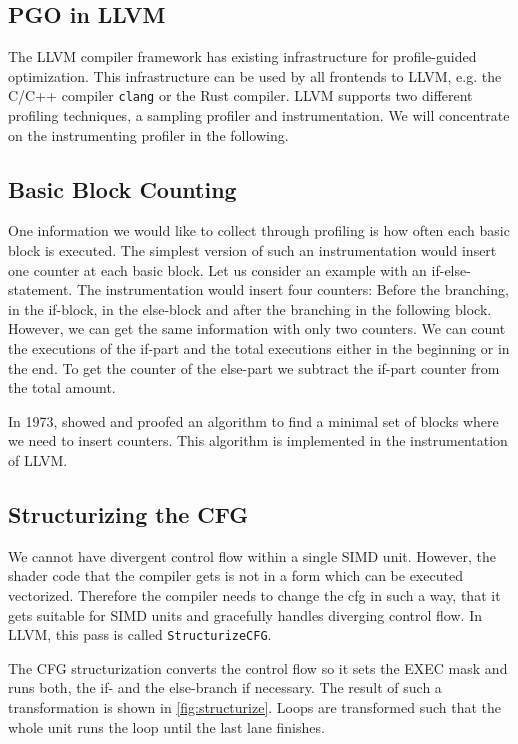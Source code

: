 \subsection{PGO in LLVM}
\label{sub:pgo-background}
The LLVM compiler framework has existing infrastructure for profile-guided optimization. This infrastructure can be used by all frontends to LLVM, e.g. the C/C++ compiler \texttt{clang} or the Rust compiler. LLVM supports two different profiling techniques, a sampling profiler and instrumentation. We will concentrate on the instrumenting profiler in the following.

\subsection{Basic Block Counting}
\label{sub:counter-instrumentation}
One information we would like to collect through profiling is how often each basic block is executed. The simplest version of such an instrumentation would insert one counter at each basic block.
Let us consider an example with an if-else-statement. The instrumentation would insert four counters: Before the branching, in the if-block, in the else-block and after the branching in the following block. However, we can get the same information with only two counters. We can count the executions of the if-part and the total executions either in the beginning or in the end. To get the counter of the else-part we subtract the if-part counter from the total amount.

In 1973, \citet{Knuth1973} showed and proofed an algorithm to find a minimal set of blocks where we need to insert counters. This algorithm is implemented in the instrumentation of LLVM.

\subsection{Structurizing the CFG}
\label{sub:structurize}
We cannot have divergent control flow within a single SIMD unit. However, the shader code that the compiler gets is not in a form which can be executed vectorized.
Therefore the compiler needs to change the \gls{cfg} in such a way, that it gets suitable for SIMD units and gracefully handles diverging control flow.
In LLVM, this pass is called \texttt{StructurizeCFG}.

The CFG structurization converts the control flow so it sets the EXEC mask and runs both, the if- and the else-branch if necessary. The result of such a transformation is shown in \cref{fig:structurize}. Loops are transformed such that the whole unit runs the loop until the last lane finishes.

